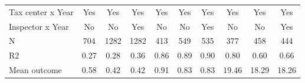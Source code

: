 \begin{tabular}{lccc|ccc|ccc}
\midrule
Tax center x Year&         Yes         &         Yes         &         Yes         &         Yes         &         Yes         &         Yes         &         Yes         &         Yes         &         Yes         \\
Inspector x Year&          No         &          No         &         Yes         &          No         &          No         &         Yes         &          No         &          No         &         Yes         \\
N           &         704         &        1282         &        1282         &         413         &         549         &         535         &         377         &         458         &         444         \\
R2          &        0.27         &        0.28         &        0.36         &        0.86         &        0.89         &        0.90         &        0.80         &        0.60         &        0.66         \\
Mean outcome&        0.58         &        0.42         &        0.42         &        0.91         &        0.83         &        0.83         &       19.46         &       18.29         &       18.26         \\
\bottomrule \end{tabular}
